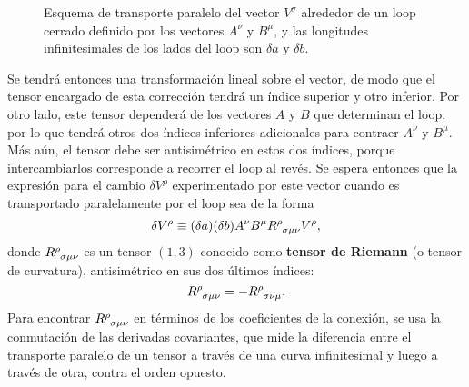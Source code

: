 \begin{figure}
\begin{center}
\end{center}

\caption{Esquema de transporte paralelo del vector $V^\sigma$ alrededor de un loop cerrado definido por los vectores $A^\nu$ y $B^\mu$, y las longitudes infinitesimales de los lados del loop son $\delta a$ y $\delta b$.}
\label{fig:loops}
\end{figure}

Se tendrá entonces una transformación lineal sobre el vector, de modo que el tensor encargado de esta corrección tendrá un índice superior y otro inferior. Por otro lado, este tensor dependerá de los vectores $A$ y $B$ que determinan el loop, por lo que tendrá otros dos índices inferiores adicionales para contraer $A^\nu$ y $B^\mu$. Más aún, el tensor debe ser antisimétrico en estos dos índices, porque intercambiarlos corresponde a recorrer el loop al revés. Se espera entonces que la expresión para el cambio $\delta V^\rho$ experimentado por este vector cuando es transportado paralelamente por el loop sea de la forma \cite{Carroll}
\begin{equation}\label{alternativeRiemann}
	\delta V^\rho\equiv (\delta a)(\delta b)A^\nu B^\mu R\indices{^\rho_{\sigma\mu\nu}}V^\rho,
\end{equation}
donde $R\indices{^\rho_{\sigma\mu\nu}}$ es un tensor $(1,3)$ conocido como \textbf{tensor de Riemann} (o tensor de curvatura), antisimétrico en sus dos últimos índices:
$$R\indices{^\rho_{\sigma\mu\nu}}=-R\indices{^\rho_{\sigma\nu\mu}}.$$
Para encontrar $R\indices{^\rho_{\sigma\mu\nu}}$ en términos de los coeficientes de la conexión, se usa la conmutación de las derivadas covariantes, que mide la diferencia entre el transporte paralelo de un tensor a través de una curva infinitesimal y luego a través de otra, contra el orden opuesto.

